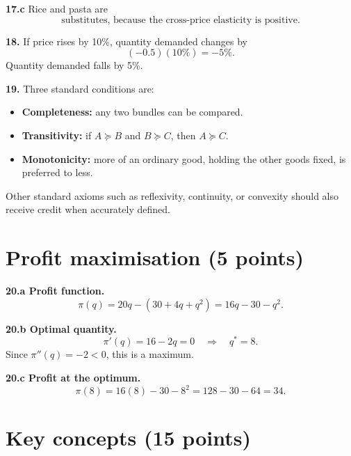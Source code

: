 \documentclass[11pt,a4paper]{article}
\begin{document}
\textbf{17.c} Rice and pasta are
\[
\boxed{\text{substitutes, because the cross-price elasticity is positive}.}
\]

\textbf{18.} If price rises by 10\%, quantity demanded changes by
\[
(-0.5)(10\%)=\boxed{-5\%}.
\]
Quantity demanded falls by 5\%.

\textbf{19.} Three standard conditions are:
\begin{itemize}
  \item \textbf{Completeness:} any two bundles can be compared.
  \item \textbf{Transitivity:} if \(A\succeq B\) and \(B\succeq C\), then
        \(A\succeq C\).
  \item \textbf{Monotonicity:} more of an ordinary good, holding the other
        goods fixed, is preferred to less.
\end{itemize}
Other standard axioms such as reflexivity, continuity, or convexity should
also receive credit when accurately defined.

\section{Profit maximisation \hfill (5 points)}

\textbf{20.a Profit function.}
\[
\pi(q)=20q-(30+4q+q^2)
=\boxed{16q-30-q^2}.
\]

\textbf{20.b Optimal quantity.}
\[
\pi'(q)=16-2q=0
\quad\Longrightarrow\quad
\boxed{q^*=8}.
\]
Since \(\pi''(q)=-2<0\), this is a maximum.

\textbf{20.c Profit at the optimum.}
\[
\pi(8)=16(8)-30-8^2
=128-30-64
=\boxed{34}.
\]

\section{Key concepts \hfill (15 points)}
\end{document}
